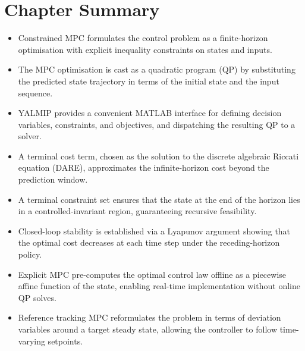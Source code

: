 \section*{Chapter Summary}
\begin{itemize}
    \item Constrained MPC formulates the control problem as a finite-horizon optimisation with explicit inequality constraints on states and inputs.
    \item The MPC optimisation is cast as a quadratic program (QP) by substituting the predicted state trajectory in terms of the initial state and the input sequence.
    \item YALMIP provides a convenient MATLAB interface for defining decision variables, constraints, and objectives, and dispatching the resulting QP to a solver.
    \item A terminal cost term, chosen as the solution to the discrete algebraic Riccati equation (DARE), approximates the infinite-horizon cost beyond the prediction window.
    \item A terminal constraint set ensures that the state at the end of the horizon lies in a controlled-invariant region, guaranteeing recursive feasibility.
    \item Closed-loop stability is established via a Lyapunov argument showing that the optimal cost decreases at each time step under the receding-horizon policy.
    \item Explicit MPC pre-computes the optimal control law offline as a piecewise affine function of the state, enabling real-time implementation without online QP solves.
    \item Reference tracking MPC reformulates the problem in terms of deviation variables around a target steady state, allowing the controller to follow time-varying setpoints.
\end{itemize}

